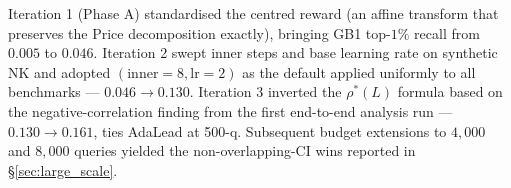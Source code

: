 Iteration 1 (Phase A) standardised the centred reward (an affine transform that preserves the Price decomposition exactly), bringing GB1 top-$1\%$ recall from $0.005$ to $0.046$. Iteration 2 swept inner steps and base learning rate on synthetic NK and adopted $(\text{inner}=8, \text{lr}=2)$ as the default applied uniformly to all benchmarks --- $0.046 \to 0.130$. Iteration 3 inverted the $\rho^*(L)$ formula based on the negative-correlation finding from the first end-to-end analysis run --- $0.130 \to 0.161$, ties AdaLead at 500-q. Subsequent budget extensions to $4{,}000$ and $8{,}000$ queries yielded the non-overlapping-CI wins reported in §\ref{sec:large_scale}.





